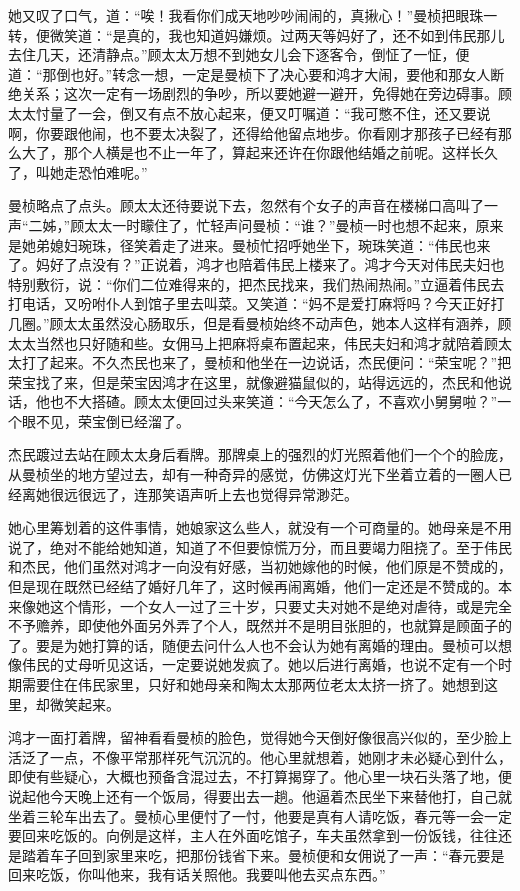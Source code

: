 \par 她又叹了口气，道：“唉！我看你们成天地吵吵闹闹的，真揪心！”曼桢把眼珠一转，便微笑道：“是真的，我也知道妈嫌烦。过两天等妈好了，还不如到伟民那儿去住几天，还清静点。”顾太太万想不到她女儿会下逐客令，倒怔了一怔，便道：“那倒也好。”转念一想，一定是曼桢下了决心要和鸿才大闹，要他和那女人断绝关系；这次一定有一场剧烈的争吵，所以要她避一避开，免得她在旁边碍事。顾太太忖量了一会，倒又有点不放心起来，便又叮嘱道：“我可憋不住，还又要说啊，你要跟他闹，也不要太决裂了，还得给他留点地步。你看刚才那孩子已经有那么大了，那个人横是也不止一年了，算起来还许在你跟他结婚之前呢。这样长久了，叫她走恐怕难呢。”
\par 曼桢略点了点头。顾太太还待要说下去，忽然有个女子的声音在楼梯口高叫了一声“二姊，”顾太太一时矇住了，忙轻声问曼桢：“谁？”曼桢一时也想不起来，原来是她弟媳妇琬珠，径笑着走了进来。曼桢忙招呼她坐下，琬珠笑道：“伟民也来了。妈好了点没有？”正说着，鸿才也陪着伟民上楼来了。鸿才今天对伟民夫妇也特别敷衍，说：“你们二位难得来的，把杰民找来，我们热闹热闹。”立逼着伟民去打电话，又吩咐仆人到馆子里去叫菜。又笑道：“妈不是爱打麻将吗？今天正好打几圈。”顾太太虽然没心肠取乐，但是看曼桢始终不动声色，她本人这样有涵养，顾太太当然也只好随和些。女佣马上把麻将桌布置起来，伟民夫妇和鸿才就陪着顾太太打了起来。不久杰民也来了，曼桢和他坐在一边说话，杰民便问：“荣宝呢？”把荣宝找了来，但是荣宝因鸿才在这里，就像避猫鼠似的，站得远远的，杰民和他说话，他也不大搭碴。顾太太便回过头来笑道：“今天怎么了，不喜欢小舅舅啦？”一个眼不见，荣宝倒已经溜了。
\par 杰民踱过去站在顾太太身后看牌。那牌桌上的强烈的灯光照着他们一个个的脸庞，从曼桢坐的地方望过去，却有一种奇异的感觉，仿佛这灯光下坐着立着的一圈人已经离她很远很远了，连那笑语声听上去也觉得异常渺茫。
\par 她心里筹划着的这件事情，她娘家这么些人，就没有一个可商量的。她母亲是不用说了，绝对不能给她知道，知道了不但要惊慌万分，而且要竭力阻挠了。至于伟民和杰民，他们虽然对鸿才一向没有好感，当初她嫁他的时候，他们原是不赞成的，但是现在既然已经结了婚好几年了，这时候再闹离婚，他们一定还是不赞成的。本来像她这个情形，一个女人一过了三十岁，只要丈夫对她不是绝对虐待，或是完全不予赡养，即使他外面另外弄了个人，既然并不是明目张胆的，也就算是顾面子的了。要是为她打算的话，随便去问什么人也不会认为她有离婚的理由。曼桢可以想像伟民的丈母听见这话，一定要说她发疯了。她以后进行离婚，也说不定有一个时期需要住在伟民家里，只好和她母亲和陶太太那两位老太太挤一挤了。她想到这里，却微笑起来。
\par 鸿才一面打着牌，留神看看曼桢的脸色，觉得她今天倒好像很高兴似的，至少脸上活泛了一点，不像平常那样死气沉沉的。他心里就想着，她刚才未必疑心到什么，即使有些疑心，大概也预备含混过去，不打算揭穿了。他心里一块石头落了地，便说起他今天晚上还有一个饭局，得要出去一趟。他逼着杰民坐下来替他打，自己就坐着三轮车出去了。曼桢心里便忖了一忖，他要是真有人请吃饭，春元等一会一定要回来吃饭的。向例是这样，主人在外面吃馆子，车夫虽然拿到一份饭钱，往往还是踏着车子回到家里来吃，把那份钱省下来。曼桢便和女佣说了一声：“春元要是回来吃饭，你叫他来，我有话关照他。我要叫他去买点东西。”
